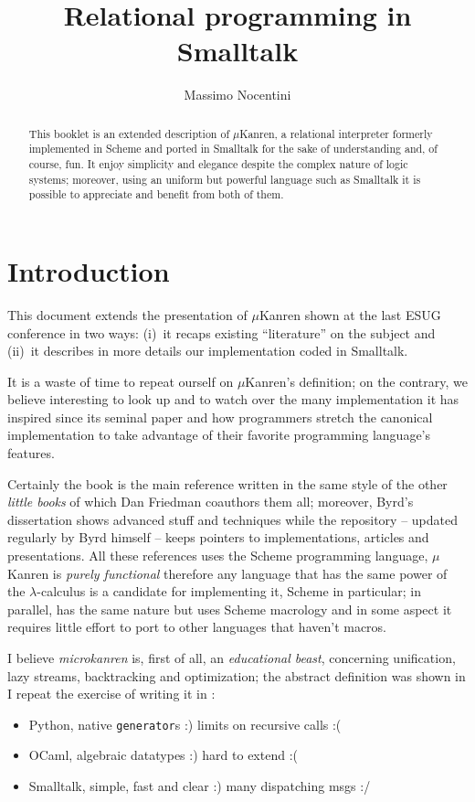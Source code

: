 \documentclass[a4paper,12pt]{article}
\author{Massimo Nocentini}
\title{Relational programming in Smalltalk}
\begin{document}
\maketitle

\begin{abstract}
This booklet is an extended description of $\mu$Kanren, a relational
interpreter formerly implemented in Scheme and ported in Smalltalk for the sake
of understanding and, of course, fun. It enjoy simplicity and elegance despite
the complex nature of logic systems; moreover, using an uniform but powerful
language such as Smalltalk it is possible to appreciate and benefit from both
of them.
\end{abstract}

\section{Introduction}

This document extends the presentation of $\mu$Kanren shown at the last ESUG
conference \citep{ESUG2018} in two ways: (i)~it recaps existing ``literature''
on the subject and (ii)~it describes in more details our implementation coded
in Smalltalk.

It is a waste of time to repeat ourself on $\mu$Kanren's definition; on the
contrary, we believe interesting to look up and to watch over the many
implementation it has inspired since its seminal paper \citep{Hemann:muKanren}
and how programmers stretch the canonical implementation to take advantage of
their favorite programming language's features.

Certainly the book \citep{Friedman:Reasoned:Schemer} is the main reference
written in the same style of the other \emph{little books} of which Dan
Friedman coauthors them all; moreover, Byrd's dissertation \citep{Byrd:PhD}
shows advanced stuff and techniques while the repository
\citep{byrd:minikanren:repo} -- updated regularly by Byrd himself -- keeps
pointers to implementations, articles and presentations. All these references
uses the Scheme programming language, $\mu$Kanren is \emph{purely functional}
therefore any language that has the same power of the $\lambda$-calculus is a
candidate for implementing it, Scheme in particular; in parallel,
\citep{byrd:minikanren} has the same nature but uses Scheme macrology and in
some aspect it requires little effort to port to other languages that haven't
macros.

I believe \textit{microkanren} is, first of all, an \textit{educational beast},
concerning unification, lazy streams, backtracking and optimization; the
abstract definition was shown in 
I repeat the exercise of writing it in \citep{Nocentini:kanrens}:
\begin{itemize}
\item Python, native \verb|generator|s :) limits on recursive calls :(
\item OCaml, algebraic datatypes :) hard to extend :(
\item Smalltalk, simple, fast and clear :) many dispatching msgs :/
\end{itemize}
\end{document}
